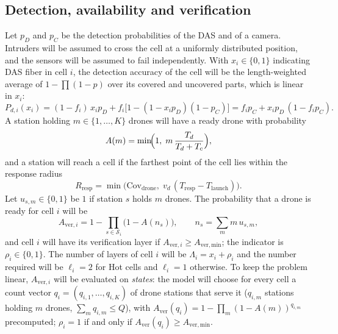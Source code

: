 \documentclass[11pt,a4paper]{article}
\begin{document}
\subsection{Detection, availability and verification}
Let $p_D$ and $p_C$ be the detection probabilities of the DAS and of a camera. Intruders will be assumed to cross the cell at a uniformly distributed position, and the sensors
will be assumed to fail independently. With $x_i\in\{0,1\}$ indicating DAS fiber in cell $i$, the detection accuracy of the cell will be the length-weighted average
of $1-\prod(1-p)$ over its covered and uncovered parts, which is linear in $x_i$:
\begin{equation}
  P_{d,i}(x_i)=(1-f_i)\,x_i p_D+f_i\bigl[1-(1-x_ip_D)(1-p_C)\bigr]=f_ip_C+x_ip_D\,(1-f_ip_C).
  \label{eq:pd}
\end{equation}
A station holding $m\in\{1,\dots,K\}$ drones will have a ready drone with probability
\begin{equation}
  A(m)=\min\!\Bigl(1,\;m\,\frac{T_{d}}{T_{d}+T_{c}}\Bigr),
  \label{eq:avail}
\end{equation}
and a station will reach a cell if the farthest point of the cell lies within the response radius
\begin{equation}
  R_{\mathrm{resp}}=\min\bigl(\mathrm{Cov}_{\mathrm{drone}},\;v_{d}\,(T_{\mathrm{resp}}-T_{\mathrm{launch}})\bigr).
  \label{eq:rresp}
\end{equation}
Let $u_{s,m}\in\{0,1\}$ be $1$ if station $s$ holds $m$ drones. The probability that a drone is ready for cell $i$ will be
\begin{equation}
  A_{\mathrm{ver},i}=1-\prod_{s\in\mathcal{S}_i}\bigl(1-A(n_s)\bigr),\qquad n_s=\sum_{m}m\,u_{s,m},
  \label{eq:aver}
\end{equation}
and cell $i$ will have its verification layer if $A_{\mathrm{ver},i}\ge A_{\mathrm{ver,min}}$; the indicator is $\rho_i\in\{0,1\}$. The number of layers of cell $i$ will be
$\Lambda_i=x_i+\rho_i$ and the number required will be $\ell_i=2$ for Hot cells and $\ell_i=1$ otherwise.
To keep the problem linear, $A_{\mathrm{ver},i}$ will be evaluated on \emph{states}: the model will choose for every cell a count vector $q_i=(q_{i,1},\dots,q_{i,K})$ of drone
stations that serve it ($q_{i,m}$ stations holding $m$ drones, $\sum_mq_{i,m}\le Q$), with $A_{\mathrm{ver}}(q_i)=1-\prod_m(1-A(m))^{q_{i,m}}$ precomputed; $\rho_i=1$ if and only if $A_{\mathrm{ver}}(q_i)\ge A_{\mathrm{ver,min}}$.
\end{document}
